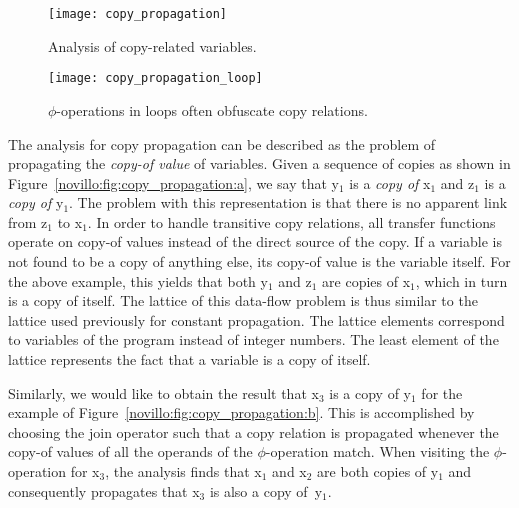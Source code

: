 \begin{figure}[t!]
  \begin{center}
    \texttt{[image: copy\_propagation]}
    \subfloat{\label{novillo:fig:copy_propagation:a}}
    \subfloat{\label{novillo:fig:copy_propagation:b}}
  \end{center}
  \vspace{-1em}
  \caption{Analysis of copy-related variables.}
  \label{novillo:fig:copy_propagation}
\end{figure}

\begin{figure}[b!]
  \begin{center}
    \texttt{[image: copy\_propagation\_loop]}
    \subfloat{\label{novillo:fig:copy_propagation_loop:a}}
    \subfloat{\label{novillo:fig:copy_propagation_loop:b}}
  \end{center}
  \vspace{-1em}
  \caption{$\phi$-operations in loops often obfuscate copy relations.}
  \label{novillo:fig:copy_propagation_loop}
\end{figure}

The analysis for copy propagation can be described as the problem of
propagating the \textit{copy-of value} of variables.  Given a sequence of
copies as shown in Figure~\ref{novillo:fig:copy_propagation:a}, we say that
y$_1$ is a \textit{copy of} x$_1$ and z$_1$ is a \textit{copy of} y$_1$.  The
problem with this representation is that there is no apparent link from z$_1$ to
x$_1$.  In order to handle transitive copy relations, all transfer functions
operate on copy-of values instead of the direct source of the copy.  If a
variable is not found to be a copy of anything else, its copy-of value is the
variable itself. For the above example, this yields that both y$_1$ and z$_1$
are copies of x$_1$, which in turn is a copy of itself. The lattice of this data-flow problem is thus similar to the lattice used previously for constant
propagation. The lattice elements correspond to variables of the
program instead of integer numbers. The least element of the lattice
represents the fact that a variable is a copy of itself.

Similarly, we would like to obtain the result that x$_3$ is a copy of y$_1$ for
the example of Figure~\ref{novillo:fig:copy_propagation:b}. This is
accomplished by choosing the join operator such that a copy relation is
propagated whenever the copy-of values of all the operands of the $\phi$-operation
match. When visiting the $\phi$-operation for x$_3$, the analysis finds
that x$_1$ and x$_2$ are both copies of y$_1$ and consequently propagates that
x$_3$ is also a copy of~y$_1$.

